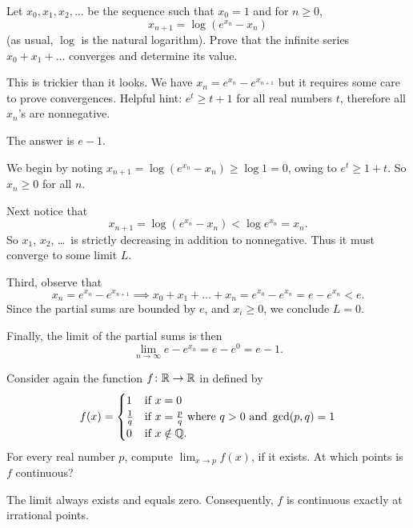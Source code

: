 \begin{problem}
	[Putnam 2016 B1]
	\gim
	Let $x_0, x_1, x_2, \dots$ be the sequence
	such that $x_0=1$ and for $n\ge 0$,
	\[ x_{n+1} = \log(e^{x_n}-x_n) \]
	(as usual, $\log$ is the natural logarithm).
	Prove that the infinite series $x_0 + x_1 + \dots$
	converges and determine its value.
	\begin{hint}
		This is trickier than it looks.
		We have $x_n = e^{x_n} - e^{x_{n+1}}$
		but it requires some care to prove convergences.
		Helpful hint: $e^t \ge t+1$ for all real numbers $t$,
		therefore all $x_n$'s are nonnegative.
	\end{hint}
	\begin{sol}
		The answer is $e-1$.

		We begin by noting $x_{n+1} = \log(e^{x_n} - x_n) \ge \log 1 = 0$,
		owing to $e^t \ge 1+t$.
		So $x_n \ge 0$ for all $n$.

		Next notice that
		\[ x_{n+1} = \log\left( e^{x_n} - x_n \right) < \log e^{x_n} = x_n. \]
		So $x_1$, $x_2$, \dots\ is strictly decreasing in addition to nonnegative.
		Thus it must converge to some limit $L$.

		Third, observe that
		\[ x_n = e^{x_n} - e^{x_{n+1}}
			\implies x_0 + x_1 + \dots + x_n
			= e^{x_0} - e^{x_n} = e - e^{x_n} < e. \]
		Since the partial sums are bounded by $e$,
		and $x_i \ge 0$, we conclude $L = 0$.

		Finally, the limit of the partial sums is then
		\[ \lim_{n \to \infty} e - e^{x_n} = e - e^0 = e - 1. \]
	\end{sol}
\end{problem}


\begin{problem}
	Consider again the function $f \colon \mathbb R \to \mathbb R$
	in  defined by
	\[ f(x) = \begin{cases}
			1 & \text{if } x = 0 \\
			\frac1q & \text{if } x = \frac pq
			\text{ where } q > 0 \text{ and } \gcd(p,q) = 1 \\
			0 & \text{if } x \notin \mathbb Q.
		\end{cases} \]
	For every real number $p$,
	compute $\lim_{x \to p} f(x)$, if it exists.
	At which points is $f$ continuous?
	\begin{hint}
		The limit always exists and equals zero.
		Consequently, $f$ is continuous exactly at irrational points.
	\end{hint}
\end{problem}
